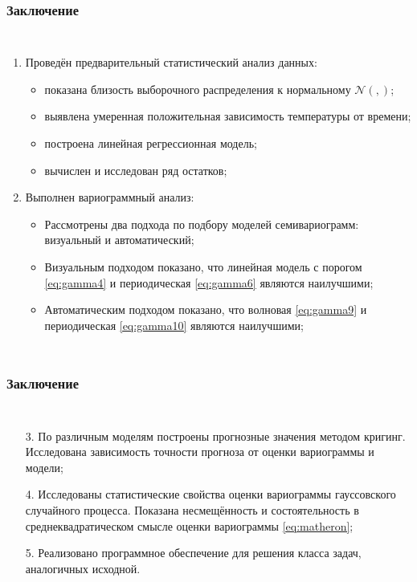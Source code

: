\documentclass[notheorems]{beamer}
\theoremstyle{definition}
\theoremstyle{example}
\theoremstyle{plain}
\newcommand{\inp}[1]{}
\newcommand{\descriptive}[2]{\inp{#1/descriptive/#2}}
\newcommand{\normaldistr}{$\mathcal{N}(\descriptive{original}{mean}, \descriptive{original}{variance})$}
\begin{document}
\begin{frame}
  \frametitle{Заключение}
  \setlength{\itemindent}{-.5in}
  \begin{columns}
  \vspace{-9pt}
  \begin{enumerate}
    \item Проведён предварительный статистический анализ данных:
      \begin{itemize}
        \item показана близость выборочного распределения к нормальному \normaldistr ;
        \item выявлена умеренная положительная зависимость температуры от времени;
        \item построена линейная регрессионная модель;
        \item вычислен и исследован ряд остатков;
      \end{itemize}
    \item Выполнен вариограммный анализ:
      \begin{itemize}
        \item Рассмотрены два подхода по подбору моделей семивариограмм: \small{визуальный и автоматический};
        \item Визуальным подходом показано, что линейная модель с порогом \eqref{eq:gamma4} и периодическая \eqref{eq:gamma6} являются наилучшими;
        \item Автоматическим подходом показано, что волновая \eqref{eq:gamma9} и периодическая \eqref{eq:gamma10} являются наилучшими;
      \end{itemize}
  \end{enumerate}
  \end{columns}
\end{frame}

\begin{frame}
  \frametitle{Заключение}
  \setlength{\itemindent}{-.5in}
  \begin{columns}
  \vspace{-9pt}
  \begin{enumerate}
    \item[3.] По различным моделям построены прогнозные значения методом кригинг. Исследована зависимость точности прогноза от оценки вариограммы и модели;
    \item[4.] Исследованы статистические свойства оценки вариограммы гауссовского случайного процесса. Показана несмещённость и состоятельность в среднеквадратическом смысле оценки вариограммы \eqref{eq:matheron};
    \item[5.] Реализовано программное обеспечение для решения класса задач, аналогичных исходной.
  \end{enumerate}
  \end{columns}
\end{frame}
\end{document}
